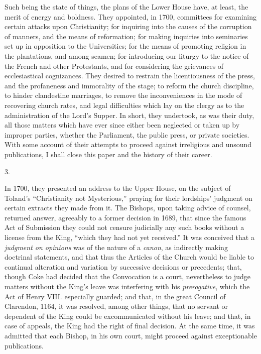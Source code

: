 Such being the state of
things, the plans of the Lower House have, at least, the merit of
energy and boldness. They appointed, in 1700, committees for examining
certain attacks upon Christianity; for inquiring into the causes of
the corruption of manners, and the means of reformation; for making
inquiries into seminaries set up in opposition to the Universities;
for the means of promoting religion in the plantations, and among
seamen; for introducing our liturgy to the notice of the French and
other Protestants, and for considering the grievances of
ecclesiastical cognizances. They desired to restrain the
licentiousness of the press, and the profaneness and immorality
of the stage; to reform the church discipline, to hinder clandestine
marriages, to remove the inconveniences in the mode of recovering
church rates, and legal difficulties which lay on the clergy as to the
administration of the Lord's Supper. In short, they undertook, as was
their duty, all those matters which have ever since either been
neglected or taken up by improper parties, whether the Parliament, the
public press, or private societies. With some account of their
attempts to proceed against irreligious and unsound publications, I
shall close this paper and the history of their career.

3.

In 1700, they presented an
address to the Upper House, on the subject of Toland's ``Christianity
not Mysterious,'' praying for their lordships' judgment on certain
extracts they made from it. The Bishops, upon taking advice of counsel,
returned answer, agreeably to a former decision in 1689, that since
the famous Act of Submission they could not censure judicially any
such books without a license from the King, ``which they had not yet
received.'' It was conceived that a \emph{judgment on opinions} was of
the nature of a \emph{canon}, as indirectly making doctrinal
statements, and that thus the Articles of the Church would be liable
to continual alteration and variation by successive decisions or
precedents; that, though Coke had decided that the Convocation is a
court, nevertheless to judge matters without the King's leave was
interfering with his \emph{prerogative}, which the Act of Henry VIII.
especially guarded; and that, in the great Council of Clarendon, 1164,
it was resolved, among other things, that no servant or dependent of
the King could be excommunicated without his leave; and that, in case
of appeals, the King had the right of final decision. At the same time, it was admitted that each Bishop, in his own court, might
proceed against exceptionable publications.

